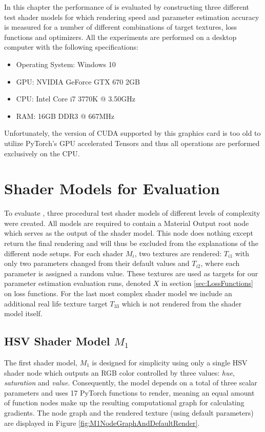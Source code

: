 In this chapter the performance of \dipter{} is evaluated by constructing three different test shader models for which rendering speed and parameter estimation accuracy is measured for a number of different combinations of target textures, loss functions and optimizers. All the experiments are performed on a desktop computer with the following specifications:

\begin{itemize}
    \item Operating System: Windows 10
    \item GPU: NVIDIA GeForce GTX 670 2GB
    \item CPU: Intel Core i7 3770K @ 3.50GHz
    \item RAM: 16GB DDR3 @ 667MHz
\end{itemize}

Unfortunately, the version of CUDA supported by this graphics card is too old to utilize PyTorch's GPU accelerated Tensors and thus all operations are performed exclusively on the CPU.

\section{Shader Models for Evaluation}\label{sec:ShaderModelsForEvaluation}

To evaluate \dipter{}, three procedural test shader models of different levels of complexity were created. All models are required to contain a Material Output root node which serves as the output of the shader model. This node does nothing except return the final rendering and will thus be excluded from the explanations of the different node setups. For each shader $M_i$, two textures are rendered: $T_{i1}$ with only two parameters changed from their default values and $T_{i2}$, where each parameter is assigned a random value. These textures are used as targets for our parameter estimation evaluation runs, denoted $X$ in section \ref{sec:LossFunctions} on loss functions. For the last most complex shader model we include an additional real life texture target $T_{33}$ which is not rendered from the shader model itself. 

\subsection{HSV Shader Model $M_1$}
The first shader model, $M_1$ is designed for simplicity using only a single HSV shader node which outputs an RGB color controlled by three values: \textit{hue}, \textit{saturation} and \textit{value}. Consequently, the model depends on a total of three scalar parameters and uses 17 PyTorch functions to render, meaning an equal amount of function nodes make up the resulting computational graph for calculating gradients. The node graph and the rendered texture (using default parameters) are displayed in Figure \ref{fig:M1NodeGraphAndDefaultRender}.

